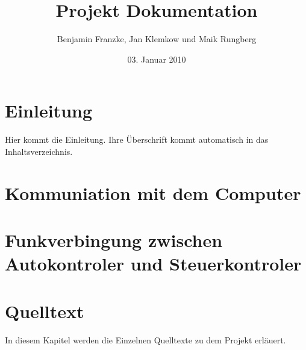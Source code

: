 \documentclass{scrartcl}
\title{Projekt Dokumentation}
\author{Benjamin Franzke, Jan Klemkow und Maik Rungberg}
\date{03. Januar 2010}
\begin{document}
\maketitle
\tableofcontents

\section{Einleitung} %
 
Hier kommt die Einleitung. Ihre Überschrift kommt
automatisch in das Inhaltsverzeichnis.

\section{Kommuniation mit dem Computer} %

\section{Funkverbingung zwischen Autokontroler und Steuerkontroler} %

\section{Quelltext} %
	In diesem Kapitel werden die Einzelnen Quelltexte zu dem Projekt erläuert.
\end{document}
